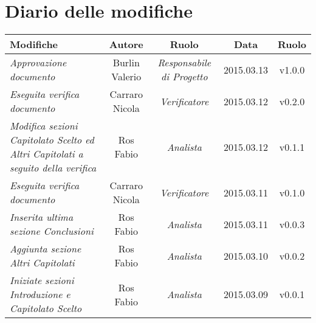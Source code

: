 \newpage
\section*{Diario delle modifiche}

\begin{table}[h]
\centering
\begin{tabular}{|p{}|c|c|c|c|}
	\toprule
		\textbf{Modifiche} & \textbf{Autore} & \textbf{Ruolo} & \textbf{Data} & \textbf{Ruolo} \\
	\midrule
	\midrule
		\textit{Approvazione documento} & Burlin Valerio & \textit{Responsabile di Progetto} & 2015.03.13 & v1.0.0 \\
	\midrule
		\textit{Eseguita verifica documento} & Carraro Nicola & \textit{Verificatore} & 2015.03.12 & v0.2.0 \\
	\midrule
		\textit{Modifica sezioni Capitolato Scelto ed Altri Capitolati a seguito della verifica} & Ros Fabio & \textit{Analista} & 2015.03.12 & v0.1.1 \\
	\midrule
		\textit{Eseguita verifica documento} & Carraro Nicola & \textit{Verificatore} & 2015.03.11 & v0.1.0 \\
	\midrule
		\textit{Inserita ultima sezione Conclusioni} & Ros Fabio & \textit{Analista} & 2015.03.11 & v0.0.3 \\
	\midrule
		\textit{Aggiunta sezione Altri Capitolati} & Ros Fabio & \textit{Analista} & 2015.03.10 & v0.0.2 \\
	\midrule
		\textit{Iniziate sezioni Introduzione e Capitolato Scelto} & Ros Fabio & \textit{Analista} & 2015.03.09 & v0.0.1 \\
	\bottomrule
\end{tabular}
\end{table}

\newpage
